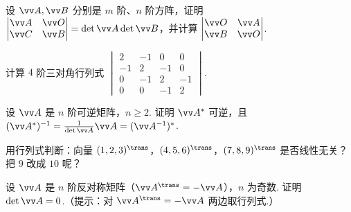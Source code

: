 {\begin{exA}
			\item\label{ex:det:A17} 设 $\vv A,\vv B$ 分别是 $m$ 阶、$n$ 阶方阵，证明 $\begin{vmatrix}\vv A&\vv O\\ \vv C&\vv B\end{vmatrix}=\det\vv A\det\vv B$，并计算 $\begin{vmatrix}\vv O&\vv A\\ \vv B&\vv O\end{vmatrix}$.
			\item\label{ex:det:A18} 计算 $4$ 阶三对角行列式 $\begin{vmatrix}2&-1&0&0\\-1&2&-1&0\\0&-1&2&-1\\0&0&-1&2\end{vmatrix}$.
			\item\label{ex:det:A19} 设 $\vv A$ 是 $n$ 阶可逆矩阵，$n\ge2$. 证明 $\vv A^*$ 可逆，且 $(\vv A^*)^{-1}=\frac1{\det\vv A}\vv A=(\vv A^{-1})^*$.
			\item\label{ex:det:A20} 用行列式判断：向量 $(1,2,3)^\trans$，$(4,5,6)^\trans$，$(7,8,9)^\trans$ 是否线性无关？把 $9$ 改成 $10$ 呢？
			\item\label{ex:det:A21} 设 $\vv A$ 是 $n$ 阶反对称矩阵（$\vv A^\trans=-\vv A$），$n$ 为奇数. 证明 $\det\vv A=0$.（提示：对 $\vv A^\trans=-\vv A$ 两边取行列式.）
		\end{exA}
		
}
